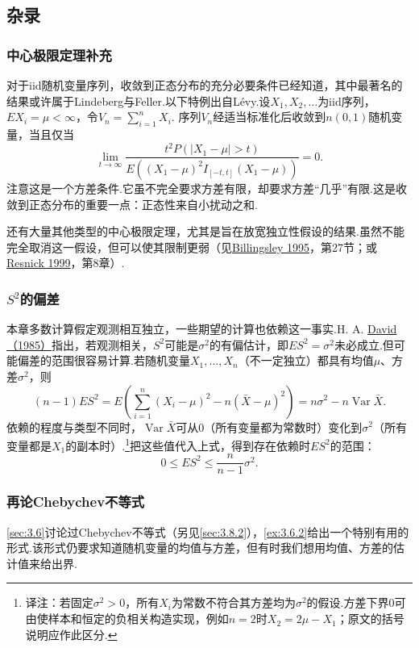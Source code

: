 \subsection{杂录}\label{sec:5.8}
\subsubsection{中心极限定理补充}\label{sec:5.8.1}
对于iid随机变量序列，收敛到正态分布的充分必要条件已经知道，其中最著名的结果或许属于Lindeberg与Feller.以下特例出自Lévy.设$X_1,X_2,\ldots$为iid序列，$EX_i=\mu<\infty$，令$V_n=\sum_{i=1}^nX_i$.
序列$V_n$经适当标准化后收敛到$n(0,1)$随机变量，当且仅当
$$\lim_{t\to\infty}\frac{t^2P(|X_1-\mu|>t)}{E((X_1-\mu)^2I_{[-t,t]}(X_1-\mu))}=0.$$
注意这是一个方差条件.它虽不完全要求方差有限，却要求方差“几乎”有限.这是收敛到正态分布的重要一点：正态性来自小扰动之和.

还有大量其他类型的中心极限定理，尤其是旨在放宽独立性假设的结果.虽然不能完全取消这一假设，但可以使其限制更弱（见\hyperref[bib:source33]{Billingsley 1995}，第27节；或\hyperref[bib:source251]{Resnick 1999}，第8章）.
\subsubsection{\texorpdfstring{$S^2$}{S²}的偏差}\label{sec:5.8.2}
本章多数计算假定观测相互独立，一些期望的计算也依赖这一事实.H. A. \hyperref[bib:source92]{David（1985）}指出，若观测相关，$S^2$可能是$\sigma^2$的有偏估计，即$ES^2=\sigma^2$未必成立.但可能偏差的范围很容易计算.若随机变量$X_1,\ldots,X_n$（不一定独立）都具有均值$\mu$、方差$\sigma^2$，则
$$(n-1)ES^2=E\left(\sum_{i=1}^n(X_i-\mu)^2-n(\bar X-\mu)^2\right)=n\sigma^2-n\operatorname{Var}\bar X.$$
依赖的程度与类型不同时，$\operatorname{Var}\bar X$可从0（所有变量都为常数时）变化到$\sigma^2$（所有变量都是$X_1$的副本时）.\footnote{译注：若固定$\sigma^2>0$，所有$X_i$为常数不符合其方差均为$\sigma^2$的假设.方差下界0可由使样本和恒定的负相关构造实现，例如$n=2$时$X_2=2\mu-X_1$；原文的括号说明应作此区分.}把这些值代入上式，得到存在依赖时$ES^2$的范围：
$$0\le ES^2\le\frac n{n-1}\sigma^2.$$
\subsubsection{再论Chebychev不等式}\label{sec:5.8.3}
\autoref{sec:3.6}讨论过Chebychev不等式（另见\autoref{sec:3.8.2}），\autoref{ex:3.6.2}给出一个特别有用的形式.该形式仍要求知道随机变量的均值与方差，但有时我们想用均值、方差的估计值来给出界.

